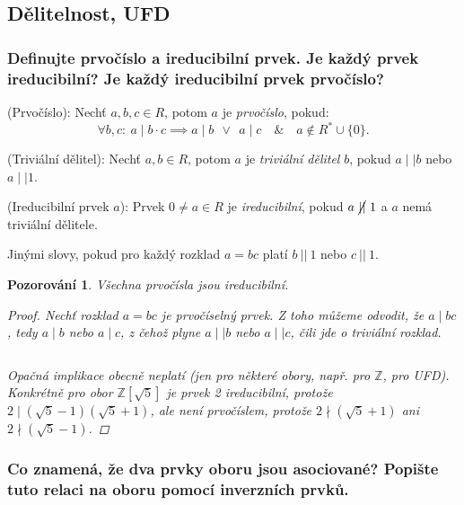 \documentclass[10pt,a4paper]{article}
\newtheorem{pozorovani}{Pozorování}
\newcommand{\Z}{{\mathbb{Z}}}       %
\begin{document}

\subsection{Dělitelnost, UFD}

\subsubsection{Definujte prvočíslo a ireducibilní prvek. Je každý prvek ireducibilní? Je každý ireducibilní prvek prvočíslo?}
 (Prvočíslo): \normalfont Nechť $a,b,c \in R$, potom $a$ je \textit{prvočíslo}, pokud: \[
    \forall b,c:~ a\mid b\cdot c \implies a \mid b ~~\lor~~ a\mid c \quad \& \quad a \notin R^* \cup \{0\}.\]

 (Triviální dělitel): \normalfont Nechť $a,b \in R$, potom $a$ je \textit{triviální dělitel} $b$, pokud $a \mid\mid b$ nebo $a \mid\mid 1 $.

 (Ireducibilní prvek $a$): \normalfont Prvek $0\neq a \in R$ je \textit{ireducibilní}, pokud $a ~\cancel{||}~ 1$ a $a$ nemá triviální dělitele. 

Jinými slovy, pokud pro každý rozklad $a = bc$ platí $b ~||~ 1$ nebo $c ~||~ 1$.

\begin{pozorovani} 
    Všechna prvočísla jsou ireducibilní.
    \begin{proof}
        Nechť rozklad $a = bc$ je prvočíselný prvek. Z toho můžeme odvodit, že $a \mid bc$, tedy $a \mid b$ nebo $a \mid c$, z čehož plyne $a \mid\mid b$ nebo $a \mid\mid c$, čili jde o triviální rozklad. 
        
        $ $

        Opačná implikace obecně neplatí (jen pro některé obory, např. pro $\Z$, pro UFD).
        Konkrétně pro obor $\Z[\sqrt 5]$ je prvek 2 ireducibilní, protože $2 \mid (\sqrt{5}-1)(\sqrt{5}+1)$, ale není prvočíslem, protože $2 \nmid (\sqrt{5}+1)$ ani $2\nmid (\sqrt{5}-1)$.
    \end{proof}
\end{pozorovani}

\subsubsection{Co znamená, že dva prvky oboru jsou asociované? Popište tuto relaci na oboru pomocí inverzních prvků.}
\end{document}
